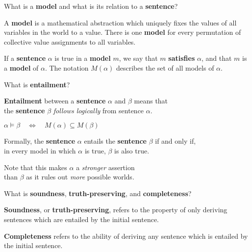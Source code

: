 \begin{flashcard}[Question]{What is a \textbf{model} and what is its relation to a \textbf{sentence}?}
\begin{center}
A \textbf{model} is a mathematical abstraction which uniquely fixes the values of all variables in the world to a value. There is one \textbf{model} for every permutation of collective value assignments to all variables.

\medskip

If a \textbf{sentence} $\alpha$ is true in a \textbf{model} $m$, we say that $m$ \textbf{satisfies} $\alpha$, and that $m$ is a \textbf{model} of $\alpha$. The notation $M(\alpha)$ describes the set of all models of $\alpha$.
\end{center}
\end{flashcard}

\begin{flashcard}[Question]{What is \textbf{entailment}?}
\begin{center}
\textbf{Entailment} between a \textbf{sentence} $\alpha$ and $\beta$ means that\\the \textbf{sentence} $\beta$ \textit{follows logically} from sentence $\alpha$.

\medskip

$\alpha \models \beta \quad \Leftrightarrow \quad M(\alpha) \subseteq M(\beta)$

\medskip

Formally, the \textbf{sentence} $\alpha$ entails the \textbf{sentence} $\beta$ if and only if,\\in every model in which $\alpha$ is true, $\beta$ is also true.

\medskip

Note that this makes $\alpha$ a \textit{stronger} assertion\\than $\beta$ as it rules out \textit{more} possible worlds.
\end{center}
\end{flashcard}

\begin{flashcard}[Question]{What is \textbf{soundness}, \textbf{truth-preserving}, and \textbf{completeness}?}
\begin{center}
\textbf{Soundness}, or \textbf{truth-preserving}, refers to the property of only deriving sentences which are entailed by the initial sentence.

\medskip

\textbf{Completeness} refers to the ability of deriving any sentence which is entailed by the initial sentence.
\end{center}
\end{flashcard}

